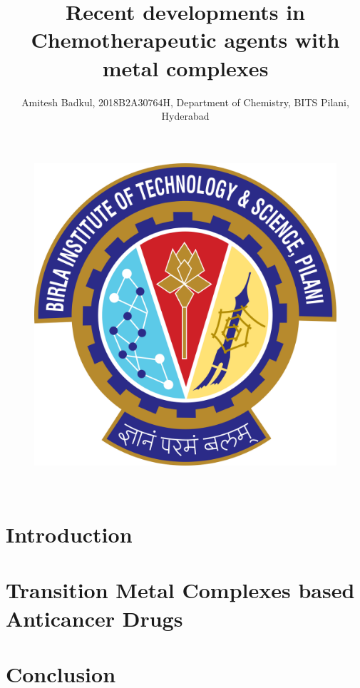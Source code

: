 \documentclass[11pt,letterpaper]{article}
\begin{document}
\thispagestyle{empty}

\title{Recent developments in Chemotherapeutic agents with metal complexes}

\author
{
\centering
Amitesh Badkul, 2018B$2$A$30764$H, Department of Chemistry, BITS Pilani, Hyderabad\\	
}

\date{}

\maketitle
\begin{figure}[!ht]
    \centering
    \includegraphics[scale = 0.15]{bits.png}
\end{figure}

\begin{abstract}
  
\end{abstract}
\\

\section{Introduction}
  

   
\section{Transition Metal Complexes based Anticancer Drugs}
  

\newpage
\section{Conclusion}
  
 




\end{document}
